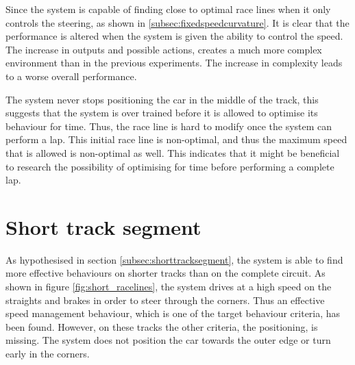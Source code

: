 Since the system is capable of finding close to optimal race lines when it only controls the steering, as shown in \ref{subsec:fixedspeedcurvature}. It is clear that the performance is altered when the system is given the ability to control the speed. The increase in outputs and possible actions, creates a much more complex environment than in the previous experiments. The increase in complexity leads to a worse overall performance. 

The system never stops positioning the car in the middle of the track, this suggests that the system is over trained before it is allowed to optimise its behaviour for time. Thus, the race line is hard to modify once the system can perform a lap. This initial race line is non-optimal, and thus the maximum speed that is allowed is non-optimal as well. This indicates that it might be beneficial to research the possibility of optimising for time before performing a complete lap.



\section{Short track segment}
\label{result:short}
As hypothesised in section \ref{subsec:shorttracksegment}, the system is able to find more effective behaviours on shorter tracks than on the complete circuit. As shown in figure \ref{fig:short_racelines}, the system drives at a high speed on the straights and brakes in order to steer through the corners. Thus an effective speed management behaviour, which is one of the target behaviour criteria, has been found. However, on these tracks the other criteria, the positioning, is missing. The system does not position the car towards the outer edge or turn early in the corners. 

